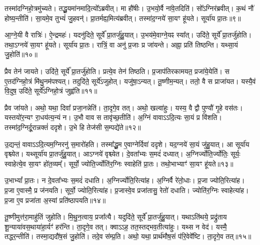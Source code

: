 तस्मा॑दग्निहो॒त्रमु॑च्यते।
तद्धू॒यमा॑नमादि॒त्यो᳚\-ऽब्रवीत्।
मा हौ॑षीः।
उ॒भयो॒र्वै ना॑वे॒तदिति॑।
सो᳚ऽग्निर॑ब्रवीत्।
क॒थं नौ॑ होष्य॒न्तीति॑।
सा॒यमे॒व तुभ्यं॑ जु॒हवन्॑।
प्रा॒तर्मह्य॒मित्य॑ब्रवीत्।
तस्मा॑द॒ग्नये॑ सा॒यꣳ हू॑यते।
सूर्या॑य प्रा॒तः॥९॥\ip

आ॒ग्ने॒यी वै रात्रिः॑।
ऐ॒न्द्रमहः॑।
यदनु॑दिते॒ सूर्ये᳚ प्रा॒तर्जु॑हु॒यात्।
उ॒भय॑मे॒वाग्ने॒यꣴ स्या᳚त्।
उदि॑ते॒ सूर्ये᳚ प्रा॒तर्जु॑होति।
तथा॒ऽग्नये॑ सा॒यꣳ हू॑यते।
सूर्या॑य प्रा॒तः।
रात्रिं॒ वा अनु॑ प्र॒जाः प्र जा॑यन्ते।
अह्ना॒ प्रति॑ तिष्ठन्ति।
यथ्सा॒यं जु॒होति॑॥१०॥\ip

प्रैव तेन॑ जायते।
उदि॑ते॒ सूर्ये᳚ प्रा॒तर्जु॑होति।
प्रत्ये॒व तेन॑ तिष्ठति।
प्र॒जा\-प॑तिरकामयत॒ प्रजा॑ये॒येति॑।
स ए॒तद॑ग्निहो॒त्रं मि॑थु॒नम॑पश्यत्।
तदुदि॑ते॒ सूर्ये॑\-ऽजुहोत्।
यजु॑षा॒\-ऽन्यत्।
तू॒ष्णीम॒न्यत्।
ततो॒ वै स प्राजा॑यत।
यस्यै॒वं वि॒दुष॒ उदि॑ते॒ सूर्ये᳚\-ऽग्निहो॒त्रं जुह्व॑ति॥११॥\ip

प्रैव जा॑यते।
अथो॒ यथा॒ दिवा᳚ प्रजा॒नन्नेति॑।
ता॒दृगे॒व तत्।
अथो॒ खल्वा॑हुः।
यस्य॒ वै द्वौ पुण्यौ॑ गृ॒हे वस॑तः।
यस्तयो॑र॒न्यꣳ रा॒धय॑त्य॒न्यं न।
उ॒भौ वाव स तावृ॑च्छ॒तीति॑।
अ॒ग्निं वावा\-ऽऽदि॒त्यः सा॒यं प्र वि॑शति।
तस्मा॑द॒ग्निर्दू॒रान्नक्तं॑ ददृशे।
उ॒भे हि तेज॑सी स॒म्पद्ये॑ते॥१२॥\ip

उ॒द्यन्तं॒ वावा\-ऽऽदि॒त्यम॒ग्निरनु॑\- स॒मारो॑हति।
तस्मा᳚द्धू॒म ए॒वाग्नेर्दिवा॑ ददृशे।
यद॒ग्नये॑ सा॒यं जु॑हु॒यात्।
आ सूर्या॑य वृश्च्येत।
यथ्सूर्या॑य प्रा॒तर्जु॑हु॒यात्।
आऽग्नये॑ वृश्च्येत।
दे॒वता᳚भ्यः स॒मदं॑ दध्यात्।
अ॒ग्निर्ज्योति॒र्ज्योतिः॒ सूर्यः॒ स्वाहेत्ये॒व सा॒यꣳ हो॑त॒व्यम्᳚।
सूर्यो॒ ज्योति॒र्ज्योति॑र॒ग्निः स्वाहेति॑ प्रा॒तः।
तथो॒भाभ्याꣳ॑ सा॒यꣳ हू॑यते॥१३॥\ip

उ॒भाभ्यां᳚ प्रा॒तः।
न दे॒वता᳚भ्यः स॒मदं॑ दधाति।
अ॒ग्निर्ज्योति॒\-रित्या॑ह।
अ॒ग्निर्वै रे॑तो॒धाः।
प्र॒जा ज्योति॒रित्या॑ह।
प्र॒जा ए॒वास्मै॒ प्र ज॑नयति।
सूर्यो॒ ज्योति॒रित्या॑ह।
प्र॒जास्वे॒व प्रजा॑तासु॒ रेतो॑ दधाति।
ज्योति॑र॒ग्निः स्वाहेत्या॑ह।
प्र॒जा ए॒व प्रजा॑ता अ॒स्यां प्रति॑\-ष्ठापयति॥१४॥\ip

तू॒ष्णीमुत्त॑रा॒माहु॑तिं जुहोति।
मि॒थु॒न॒त्वाय॒ प्रजा᳚त्यै।
यदुदि॑ते॒ सूर्ये᳚ प्रा॒तर्जु॑हु॒यात्।
यथाऽति॑थये॒ प्रद्रु॑ताय शू॒न्याया॑वस॒थाया॑हा॒र्यꣳ॑ हर॑न्ति।
ता॒दृगे॒व तत्।
क्वाऽऽह॒ तत॒स्तद्भव॒तीत्या॑हुः।
यथ्स न वेद॑।
यस्मै॒ तद्धर॒न्तीति॑।
तस्मा॒द्यदौ॑ष॒सं जु॒होति॑।
तदे॒व स॑म्प्र॒ति।
अथो॒ यथा॒ प्रार्थ॑मौष॒सं प॑रि॒वेवे᳚ष्टि।
ता॒दृगे॒व तत्॥१५॥\ip\anuvakamend[अ॒मृ॒ष्ट॒ वि॒चि॒किथ्स॑ति॒ जुह्व॑त्य॒जाम॑\-सृजताग्निहो॒त्रꣳ सूर्या॑य प्रा॒तर्जु॒होति॒ जुह्व॑ति स॒म्पद्ये॑ते हूयते स्थापयति सम्प्र॒ति द्वे च॑]

